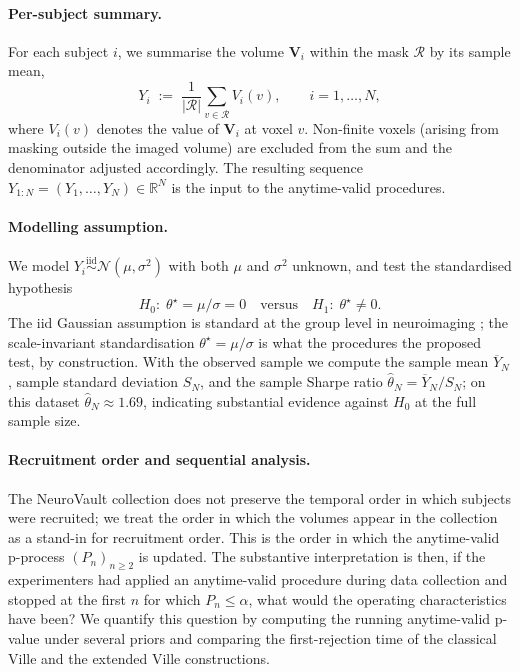 \documentclass{article}%
\newcommand{\1}{\mathbf{1}}
\begin{document}
\paragraph{Per-subject summary.}
For each subject $i$, we summarise the volume $\mathbf{V}_i$ within the
mask $\mathcal{R}$ by its sample mean,
\begin{equation}
\label{eq:y_obs_def}
  Y_i \;:=\; \frac{1}{|\mathcal{R}|}\sum_{v \in \mathcal{R}} V_i(v),
  \qquad i = 1, \ldots, N,
\end{equation}
where $V_i(v)$ denotes the value of $\mathbf{V}_i$ at voxel $v$. Non-finite
voxels (arising from masking outside the imaged volume) are excluded from
the sum and the denominator adjusted accordingly. The resulting sequence
$Y_{1:N} = (Y_1, \ldots, Y_N) \in \mathbb{R}^N$ is the input to the
anytime-valid procedures.

\paragraph{Modelling assumption.}
We model $Y_i \stackrel{\mathrm{iid}}{\sim} \mathcal{N}(\mu, \sigma^2)$
with both $\mu$ and $\sigma^2$ unknown, and test the standardised
hypothesis
\[
  H_0:\; \theta^\star = \mu/\sigma = 0
  \quad\text{versus}\quad
  H_1:\; \theta^\star \neq 0.
\]
The iid Gaussian assumption is standard at the group level in neuroimaging
\cite{penny2012comparing}; the scale-invariant standardisation $\theta^\star =
\mu/\sigma$ is what the procedures the proposed test, by construction. With the observed sample we compute the sample mean $\overline{Y}_N$, sample standard deviation $S_N$, and the sample Sharpe ratio $\widehat\theta_N = \overline{Y}_N / S_N$; on this dataset $\widehat\theta_N \approx 1.69$, indicating substantial evidence against $H_0$ at the full sample size.

\paragraph{Recruitment order and sequential analysis.}
The NeuroVault collection does not preserve the temporal order in which subjects were recruited; we treat the order in which the volumes appear in the collection as a stand-in for recruitment order. This is the order in which the anytime-valid p-process $(P_n)_{n \geq 2}$ is updated. The substantive interpretation is then,  if the experimenters had applied an anytime-valid procedure during data collection and stopped at the first $n$ for which $P_n \leq \alpha$, what would the operating characteristics have been? We quantify this question by computing the running anytime-valid p-value under several priors and comparing the first-rejection time of the classical Ville and the extended Ville constructions. 
\end{document}
